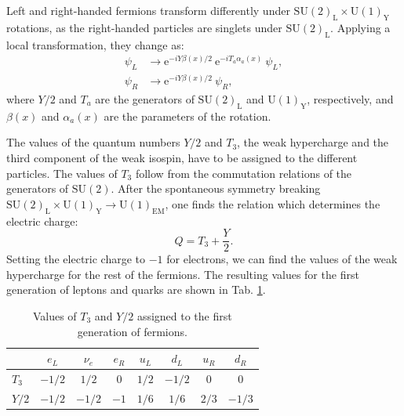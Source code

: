 Left and right-handed fermions transform differently under $\mathrm{SU}(2)_{\mathrm{L}}\times\mathrm{U}(1)_{\mathrm{Y}}$ rotations, as the right-handed particles are singlets under $\mathrm{SU}(2)_{\mathrm{L}}$. Applying a local transformation, they change as:
\begin{equation}
	\begin{split}
		\psi_{L} &\longrightarrow \mathrm{e}^{-iY\beta(x)/2}~\mathrm{e}^{-iT_{a}\alpha_{a}(x)}~\psi_{L},\\
		\psi_{R} &\longrightarrow \mathrm{e}^{-iY\beta(x)/2}~\psi_{R},
	\end{split}
\end{equation}
where $Y/2$ and $T_{a}$ are the generators of $\mathrm{SU}(2)_{\mathrm{L}}$ and $\mathrm{U}(1)_{\mathrm{Y}}$, respectively, and $\beta(x)$ and $\alpha_{a}(x)$ are the parameters of the rotation.

The values of the quantum numbers $Y/2$ and $T_{3}$, the weak hypercharge and the third component of the weak isospin, have to be assigned to the different particles. The values of $T_{3}$ follow from the commutation relations of the generators of $\mathrm{SU}(2)$. After the spontaneous symmetry breaking $\mathrm{SU}(2)_{\mathrm{L}}\times\mathrm{U}(1)_{\mathrm{Y}} \rightarrow \mathrm{U}(1)_{\mathrm{EM}}$, one finds the relation which determines the electric charge:
\begin{equation}
	Q = T_{3} + \frac{Y}{2}.
\end{equation}
Setting the electric charge to $-1$ for electrons, we can find the values of the weak hypercharge for the rest of the fermions. The resulting values for the first generation of leptons and quarks are shown in Tab. \ref{tab:sm_charge}.

\begin{table}[t]
	\centering
	\caption{Values of $T_{3}$ and $Y/2$ assigned to the first generation of fermions.}
		\begin{tabular}{l|ccccccc}
			& $e_{L}$ & $\nu_{e}$ & $e_{R}$ & $u_{L}$ & $d_{L}$ & $u_{R}$ & $d_{R}$ \\[2mm] \hline
			\rule{0pt}{1.1\normalbaselineskip}$T_{3}$ & $-1/2$  & $1/2$     & $0$     & $1/2$   & $-1/2$  & $0$     & $0$     \\[2mm]
			$Y/2$   & $-1/2$  & $-1/2$    & $-1$    & $1/6$   & $1/6$   & $2/3$   & $-1/3$ 
		\end{tabular}
	\label{tab:sm_charge}
\end{table}

